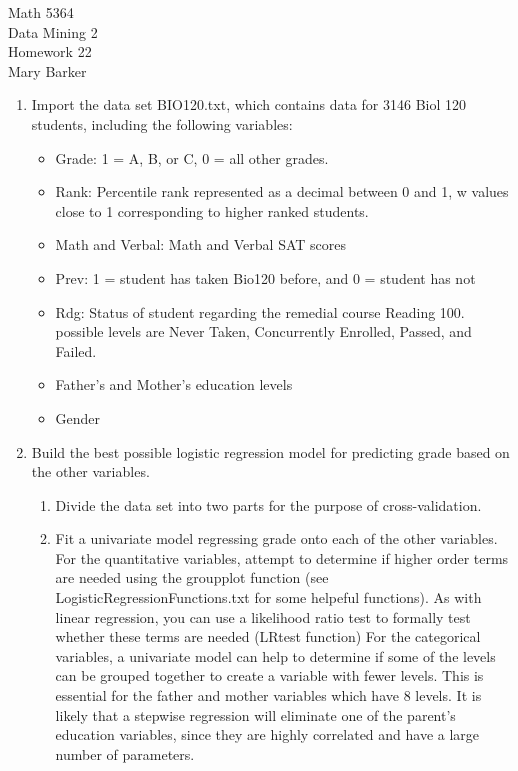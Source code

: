 \documentclass[11pt]{article}
\begin{document}
\noindent\large{Math 5364}\\
\large{Data Mining 2}\\
\large{Homework 22}\\
\large{Mary Barker}
\doublespace

\begin{enumerate}
    \item Import the data set BIO120.txt, which contains data for 3146 Biol 120 students, 
    including the following variables: 
    \begin{itemize}
	\item Grade: 1 = A, B, or C, 0 = all other grades.
	\item Rank: Percentile rank represented as a decimal between 0 and 1, w 
              values close to 1 corresponding to higher ranked students. 
	\item Math and Verbal: Math and Verbal SAT scores
	\item Prev: 1 = student has taken Bio120 before, and 0 = student has not
	\item Rdg: Status of student regarding the remedial course Reading 100. 
              possible levels are Never Taken, Concurrently Enrolled, Passed, and Failed. 
	\item Father's and Mother's education levels
	\item Gender
    \end{itemize}

    \item Build the best possible logistic regression model for predicting grade based on 
     the other variables.

	\begin{enumerate}
		\item Divide the data set into two parts for the purpose of cross-validation. 

		\item  Fit a univariate model regressing grade onto each of the other variables. 
	         For the quantitative variables, attempt to determine if higher order terms 
	         are needed using the groupplot function (see LogisticRegressionFunctions.txt 
	         for some helpeful functions). As with linear regression, you can use a 
	         likelihood ratio test to formally test whether these terms are needed 
	         (LRtest function)
	         For the categorical variables, a univariate model can help to determine if 
	         some of the levels can be grouped together to create a variable with fewer 
	         levels. This is essential for the father and mother variables which have 8 
	         levels. It is likely that a stepwise regression will eliminate one of the 
	         parent's education variables, since they are highly correlated and have a 
	         large number of parameters. 


\end{enumerate}
\end{enumerate}
\end{document}
